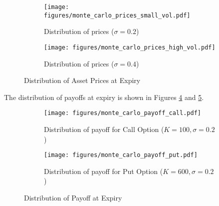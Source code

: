 \begin{figure}[H]
    \centering
    \begin{subfigure}[t]{0.45\textwidth}
        \centering
        \texttt{[image: figures/monte\_carlo\_prices\_small\_vol.pdf]}
        \caption{Distribution of prices ($\sigma=0.2$)}
        \label{fig:price-distribution-lower-vol}
    \end{subfigure}
    \hfill
    \begin{subfigure}[t]{0.45\textwidth}
        \centering
        \texttt{[image: figures/monte\_carlo\_prices\_high\_vol.pdf]}
        \caption{Distribution of prices ($\sigma=0.4$)}
        \label{fig:price-distribution-higher-vol}
    \end{subfigure}
    \caption{Distribution of Asset Prices at Expiry}
    \label{fig:price-distribution}
\end{figure}

The distribution of payoffs at expiry is shown in Figures \ref{fig:payoff-distribution-call} and \ref{fig:payoff-distribution-put}. 

\begin{figure}[H]
    \centering
    \begin{subfigure}[t]{0.45\textwidth}
        \centering
        \texttt{[image: figures/monte\_carlo\_payoff\_call.pdf]}
        \caption{Distribution of payoff for Call Option ($K = 100, \sigma = 0.2$)}
        \label{fig:payoff-distribution-call}
    \end{subfigure}
    \hfill
    \begin{subfigure}[t]{0.45\textwidth}
        \centering
        \texttt{[image: figures/monte\_carlo\_payoff\_put.pdf]}
        \caption{Distribution of payoff for Put Option ($K = 600, \sigma = 0.2$)}
        \label{fig:payoff-distribution-put}
    \end{subfigure}
    \caption{Distribution of Payoff at Expiry}
    \label{fig:payoff-distribution}
\end{figure}

